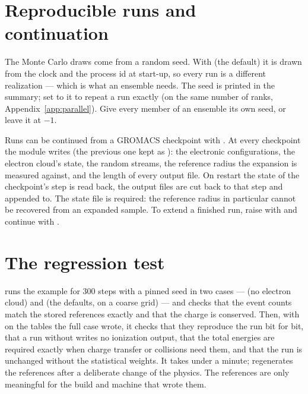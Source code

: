 \section{Reproducible runs and continuation}
\label{sec:seed}

The Monte Carlo draws come from a random seed.
With  (the default) it is drawn from the clock and the process id at start-up, so every run is
a different realization --- which is what an ensemble needs.
The seed is printed in the summary; set  to it to repeat a run exactly (on the same number of
ranks, Appendix~\ref{app:parallel}).
Give every member of an ensemble its own seed, or leave it at $-1$.

Runs can be continued from a GROMACS checkpoint with .
At every checkpoint the module writes  (the previous one kept as
): the electronic configurations, the electron cloud's state, the random streams, the
reference radius the expansion is measured against, and the length of every output file.
On restart the state of the checkpoint's step is read back, the output files are cut back to that step and appended
to.
The state file is required: the reference radius in particular cannot be recovered from an expanded sample.
To extend a finished run, raise  with  and continue with .

\section{The regression test}

 runs the example for 300 steps with a pinned seed in two cases ---  (no
electron cloud) and  (the defaults, on a coarse grid) --- and checks that the event counts match the
stored references exactly and that the charge is conserved.
Then, with  on the tables the full case wrote, it checks that they reproduce the run
bit for bit, that a run without  writes no ionization output, that the total energies are required
exactly when charge transfer or collisions need them, and that the run is unchanged without the statistical weights.
It takes under a minute;  regenerates the references after a deliberate change of the physics.
The references are only meaningful for the build and machine that wrote them.
